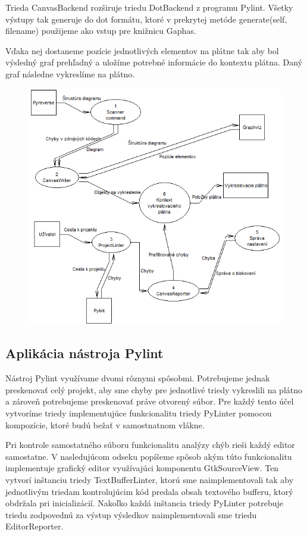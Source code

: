 \documentclass[11pt,oneside,final]{fithesis2}
\begin{document}
			Trieda CanvasBackend rozširuje triedu DotBackend z programu Pylint. Všetky výstupy tak generuje do dot formátu, ktoré v prekrytej metóde generate(self, filename) použijeme ako vstup pre knižnicu Gaphas. 
			
			Vďaka nej dostaneme pozície jednotlivých elementov na plátne tak aby bol výsledný graf prehľadný a uložíme potrebné informácie do kontextu plátna. Daný graf následne vykreslíme na plátno.
	

	\begin{figure}[htb]
	 \centering
	 \includegraphics[width=\textwidth]{images/dfd_diagram}
	\end{figure}

	
		\subsection{Aplikácia nástroja Pylint}

		Nástroj Pylint využívame dvomi rôznymi spôsobmi. Potrebujeme jednak preskenovať celý projekt, aby sme chyby pre jednotlivé triedy vykreslili na plátno a zároveň potrebujeme preskenovať práve otvorený súbor. Pre každý tento účel vytvoríme triedy implementujúce funkcionalitu triedy PyLinter pomocou kompozície, ktoré budú bežať v samostnatnom vlákne. 
		
		Pri kontrole samostatného súboru funkcionalitu analýzy chýb rieši každý editor samostatne. V nasledujúcom odseku popíšeme spôsob akým túto funkcionalitu implementuje grafický editor využívajúci komponentu GtkSourceView. Ten vytvorí inštanciu triedy TextBufferLinter, ktorú sme naimplementovali tak aby jednotlivým triedam kontrolujúcim kód predala obsah textového bufferu, ktorý obdržala pri inicializácií. Nakoľko každá inštancia triedy PyLinter potrebuje triedu zodpovednú za výstup výsledkov naimplementovali sme triedu EditorReporter.
		
\end{document}
